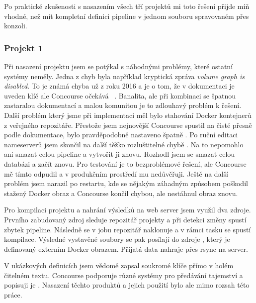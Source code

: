         Po praktické zkušenosti s nasazením všech tří projektů mi toto řešení přijde míň vhodné, než mít kompletní definici pipeline v jednom souboru spravovaném přes konzoli.


        \subsubsection{Projekt 1}
            Při nasazení projektu jsem se potýkal s náhodnými problémy, které ostatní \CI systémy neměly. Jedna z chyb byla například kryptická zpráva \textit{volume graph is disabled}. To je známá chyba už z roku 2016 a je o tom, že v dokumentaci je uveden klíč  ale Concourse očekává ~\cite{concourse-issue-402}. Banalita, ale při kombinaci se špatnou zastaralou dokumentací a malou komunitou je to zdlouhavý problém k řešení. Další problém který jsme při implementaci měl bylo stahování Docker kontejnerů z veřejného repozitáře. Přestože jsem nejnovější Concourse spustil na čisté  přesně podle dokumentace, bylo pravděpodobně nastaveno špatně . Po ruční editaci nameserverů jsem skončil na další těžko rozluštitelné chybě . Na to nepomohlo ani smazat celou pipeline a vytvořit ji znovu. Rozhodl jsem se smazat celou databázi a začít znovu. Pro testování je to bezproblémové řešení, ale Concourse mě tímto odpudil a v produkčním prostředí mu nedůvěřuji. Ještě na další problém jsem narazil po restartu, kde se nějakým záhadným způsobem poškodil stažený Docker obraz a Concourse končil chybou, ale nestáhnul obraz znovu.

            Pro kompilaci projektu a nahrání výsledků na web server jsem využil dva zdroje. Prvního zabudovaný zdroj  sleduje repozitář projekty a při detekci změny spustí zbytek pipeline. Následně se v jobu repozitář naklonuje a v rámci tasku se spustí kompilace. Výsledné vystavěné soubory se pak posílají do zdroje , který je definovaný externím Docker obrazem. Přijatá data nahraje přes rsync na server.

            V ukázkových definicích jsem vědomě zapsal soukromé klíče přímo v holém čitelném textu. Concourse podporuje různé systémy pro předávání tajemství a popisuji je . Nasazení těchto produktů a jejich použití bylo ale mimo rozsah této práce.

